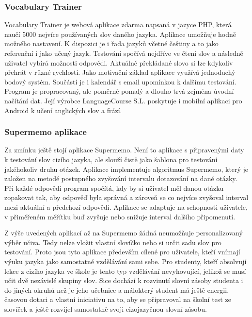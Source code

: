 \documentclass[a4paper,11pt,titlepage,fleqn]{article}
\begin{document}
        \subsubsection{Vocabulary Trainer}
            Vocabulary Trainer je webová aplikace zdarma napsaná v jazyce PHP, která naučí 5000 nejvíce používaných slov daného jazyka. Aplikace umožňuje hodně možného nastavení. K dispozici je i řada jazyků včetně češtiny a to jako referenční i jako učený jazyk. Testování spočívá nejdříve ve čtení slov a následně uživatel vybírá možnosti odpovědi. Aktuálně překládané slovo si lze kdykoliv přehrát v různé rychlosti. Jako motivační základ aplikace využívá jednoduchý bodový systém. Součástí je i kalendář s email upomínkou k dalšímu testování. Program je propracovaný, ale poměrně pomalý a dlouho trvá zejména úvodní načítání dat. Její výrobce LanguageCourse S.L. poskytuje i mobilní aplikaci pro Android k učení anglických slov a frází.

        \subsubsection{Supermemo aplikace}
            \label{supermemo-app}
            Za zmínku ještě stojí aplikace Supermemo. Není to aplikace s připravenými daty k testování slov cizího jazyka, ale slouží čistě jako šablona pro testování jakéhokoliv druhu otázek. Aplikace implementuje algoritmus Supermemo, který je založen na metodě postupného zvyšování intervalu dotazování na dané otázky. Při každé odpovědi program spočítá, kdy by si uživatel měl danou otázku zopakovat tak, aby odpověď byla správná a zároveň se co nejvíce zvyšoval interval mezi aktuální a předchozí odpovědí. Aplikace se adaptuje na schopnosti uživatele, v přiměřeném měřítku buď zvyšuje nebo snižuje interval dalšího připomenutí.



        Z výše uvedených aplikací až na Supermemo žádná neumožňuje personalizovaný výběr učiva. Tedy nelze vložit vlastní slovíčko nebo si určit sadu slov pro testování. Proto jsou tyto aplikace především cílené pro uživatele, kteří vnímají výuku jazyka jako samostatné vzdělávání sami sebe. Pro studenty, kteří absolvují lekce z cizího jazyka ve škole je tento typ vzdělávání nevyhovující, jelikož se musí učit dvě nezávislé skupiny slov. Sice dochází k rozvinutí slovní zásoby studenta i do jiných okruhů než je jeho učebnice a málokterý student má ještě energii, časovou dotaci a vlastní iniciativu na to, aby se připravoval na školní test ze slovíček a ještě rozvíjel samostatně svoji cizojazyčnou slovní zásobu.
\end{document}
